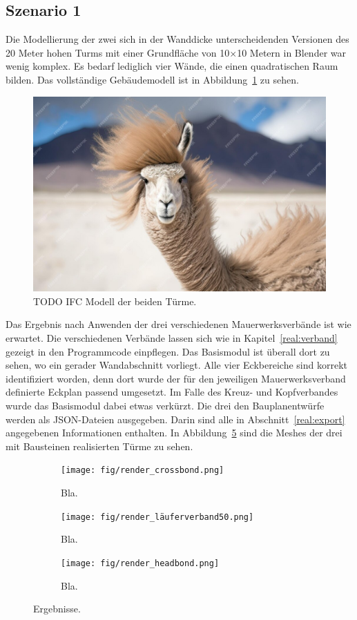 \subsection{Szenario 1}\label{poc:scenario1}
Die Modellierung der zwei sich in der Wanddicke unterscheidenden Versionen des 20 Meter hohen Turms mit einer Grundfläche von 10$\times$10 Metern in Blender war wenig komplex.
Es bedarf lediglich vier Wände, die einen quadratischen Raum bilden.
Das vollständige Gebäudemodell ist in Abbildung~\ref{fig:poc:scenario1 modell} zu sehen.
\begin{figure}[ht!]
  \centering
  \includegraphics[width=0.6\columnwidth]{fig/TODO.jpg}
  \caption{TODO IFC Modell der beiden Türme.}\label{fig:poc:scenario1 modell}
\end{figure}
Das Ergebnis nach Anwenden der drei verschiedenen Mauerwerksverbände ist wie erwartet.
Die verschiedenen Verbände lassen sich wie in Kapitel~\ref{real:verband} gezeigt in den Programmcode einpflegen.
Das Basismodul ist überall dort zu sehen, wo ein gerader Wandabschnitt vorliegt.
Alle vier Eckbereiche sind korrekt identifiziert worden, denn dort wurde der für den jeweiligen Mauerwerksverband definierte Eckplan passend umgesetzt.
Im Falle des Kreuz- und Kopfverbandes wurde das Basismodul dabei etwas verkürzt.
Die drei den Bauplanentwürfe werden als JSON-Dateien ausgegeben.
Darin sind alle in Abschnitt~\ref{real:export} angegebenen Informationen enthalten.
In Abbildung~\ref{fig:poc:result_scenario1} sind die Meshes der drei mit Bausteinen realisierten Türme zu sehen.


\begin{figure}[htb]
    \begin{subfigure}[b]{0.3\columnwidth}
      \texttt{[image: fig/render\_crossbond.png]}
      \caption{Bla.}\label{fig:poc:render_crossbond}
    \end{subfigure}
    \hfill
    \begin{subfigure}[b]{0.3\columnwidth}
      \texttt{[image: fig/render\_läuferverband50.png]}
      \caption{Bla.}\label{fig:poc:render_laeuferverband50}
    \end{subfigure}
    \hfill
    \begin{subfigure}[b]{0.3\columnwidth}
      \texttt{[image: fig/render\_headbond.png]}
      \caption{Bla.}\label{fig:poc:render_headbond}
    \end{subfigure}
    \caption{Ergebnisse.}\label{fig:poc:result_scenario1}
  \end{figure}

